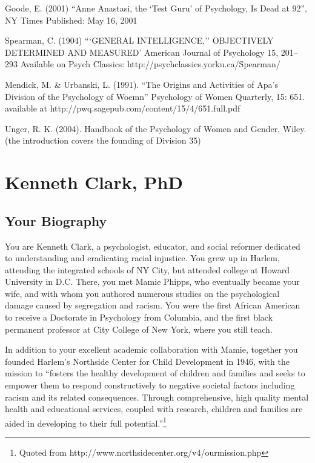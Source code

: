 \begin{refsection}
Goode, E. (2001) ``Anne Anastasi, the `Test Guru' of Psychology, Is Dead at 92'', NY Times Published: May 16, 2001

Spearman, C. (1904) ```GENERAL INTELLIGENCE,'' OBJECTIVELY DETERMINED AND MEASURED' American Journal of Psychology 15, 201--293 Available on Psych Classics: http:\slash \slash psychclassics.yorku.ca\slash Spearman\slash 

Mendick, M. \& Urbanski, L. (1991). ``The Origins and Activities of Apa's Division of the Psychology of Woemn'' Psychology of Women Quarterly, 15: 651. available at http:\slash \slash pwq.sagepub.com\slash content\slash 15\slash 4\slash 651.full.pdf

Unger, R. K. (2004). Handbook of the Psychology of Women and Gender, Wiley. (the introduction covers the founding of Division 35)

\chapter{Kenneth Clark, PhD}
\label{kennethclarkphd}

\section{Your Biography}
\label{yourbiography}

You are Kenneth Clark, a psychologist, educator, and social reformer dedicated to understanding and eradicating racial injustice. You grew up in Harlem, attending the integrated schools of NY City, but attended college at Howard University in D.C. There, you met Mamie Phipps, who eventually became your wife, and with whom you authored numerous studies on the psychological damage caused by segregation and racism. You were the first African American to receive a Doctorate in Psychology from Columbia, and the first black permanent professor at City College of New York, where you still teach.

In addition to your excellent academic collaboration with Mamie, together you founded Harlem's Northside Center for Child Development in 1946, with the mission to ``fosters the healthy development of children and families and seeks to empower them to respond constructively to negative societal factors including racism and its related consequences. Through comprehensive, high quality mental health and educational services, coupled with research, children and families are aided in developing to their full potential.''\footnote{Quoted from http:\slash \slash www.northsidecenter.org\slash v4\slash ourmission.php}


\end{refsection}

